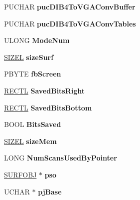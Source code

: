 \begin{DoxyCompactItemize}
P\+U\+C\+H\+AR {\bfseries puc\+D\+I\+B4\+To\+V\+G\+A\+Conv\+Buffer}
\item 
\mbox{\label{struct___p_d_e_v_a93c6959bc996dae77df28fb02201a6ad}} 
P\+U\+C\+H\+AR {\bfseries puc\+D\+I\+B4\+To\+V\+G\+A\+Conv\+Tables}
\item 
\mbox{\label{struct___p_d_e_v_a6a34fba817779759ad7e056fbc1fd89a}} 
U\+L\+O\+NG {\bfseries Mode\+Num}
\item 
\mbox{\label{struct___p_d_e_v_a132ac60789daa068e041e3a147849d2f}} 
\hyperlink{structtag_s_i_z_e}{S\+I\+Z\+EL} {\bfseries size\+Surf}
\item 
\mbox{\label{struct___p_d_e_v_a45405e1f02989a6025bad68490241806}} 
P\+B\+Y\+TE {\bfseries fb\+Screen}
\item 
\mbox{\label{struct___p_d_e_v_a73375655a5baa61db1209093510c02d5}} 
\hyperlink{struct___r_e_c_t_l}{R\+E\+C\+TL} {\bfseries Saved\+Bits\+Right}
\item 
\mbox{\label{struct___p_d_e_v_af6c0e5e4afac80af419768d355a94054}} 
\hyperlink{struct___r_e_c_t_l}{R\+E\+C\+TL} {\bfseries Saved\+Bits\+Bottom}
\item 
\mbox{\label{struct___p_d_e_v_ab0d80f66919144cfd24761e713494f8b}} 
B\+O\+OL {\bfseries Bits\+Saved}
\item 
\mbox{\label{struct___p_d_e_v_a7d00b17218b054ae6de4bf7e45223519}} 
\hyperlink{structtag_s_i_z_e}{S\+I\+Z\+EL} {\bfseries size\+Mem}
\item 
\mbox{\label{struct___p_d_e_v_a20dfadb6cb57f2db22d42c7f4d5b89b4}} 
L\+O\+NG {\bfseries Num\+Scans\+Used\+By\+Pointer}
\item 
\mbox{\label{struct___p_d_e_v_a1cc2c5995373acaed1e44f86ce2267ea}} 
\hyperlink{struct___s_u_r_f_o_b_j}{S\+U\+R\+F\+O\+BJ} $\ast$ {\bfseries pso}
\item 
\mbox{\label{struct___p_d_e_v_a8d18a90bf4e0f30bb2e3905668875c06}} 
U\+C\+H\+AR $\ast$ {\bfseries pj\+Base}
\end{DoxyCompactItemize}


